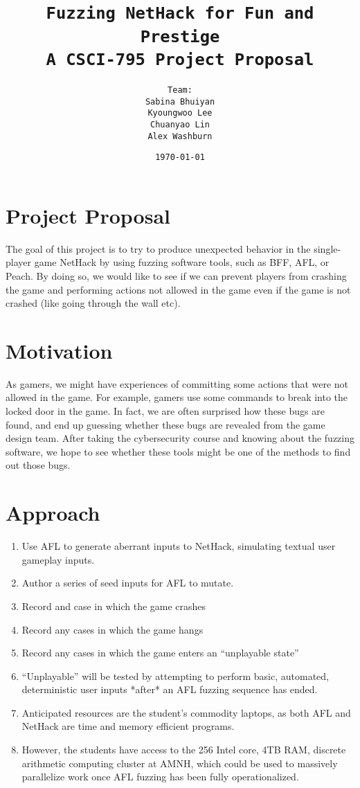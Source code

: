 \documentclass[12pt]{diazessay}
\title{\texttt{\huge{Fuzzing NetHack for Fun and Prestige} \\ {\large A CSCI-795 Project Proposal}}} %
\author{\texttt{{\Huge Team:}\\\vspace*{-0.5em} 
		Sabina Bhuiyan \\\vspace*{-0.5em} 
		Kyoungwoo Lee \\\vspace*{-0.5em}
		Chuanyao Lin \\\vspace*{-0.25em}
		Alex Washburn}} %
\date{\texttt{\today}} %
\begin{document}
\maketitle %

\section*{Project Proposal}

The goal of this project is to try to produce unexpected behavior in the single-player game NetHack by using fuzzing software tools, such as BFF, AFL, or Peach.
By doing so, we would like to see if we can prevent players from crashing the game and performing actions not allowed in the game even if the game is not crashed (like going through the wall etc).


\section*{Motivation}

As gamers, we might have experiences of committing some actions that were not allowed in the game.
For example, gamers use some commands to break into the locked door in the game.
In fact, we are often surprised how these bugs are found, and end up guessing whether these bugs are revealed from the game design team.
After taking the cybersecurity course and knowing about the fuzzing software, we hope to see whether these tools might be one of the methods to find out those bugs.


\section*{Approach}

\begin{enumerate}
  \item Use AFL to generate aberrant inputs to NetHack, simulating textual user gameplay inputs.
  \item Author a series of seed inputs for AFL to mutate.
  \item Record and case in which the game crashes
  \item Record any cases in which the game hangs
  \item Record any cases in which the game enters an “unplayable state”
  \item “Unplayable” will be tested by attempting to perform basic, automated, deterministic user inputs *after* an AFL fuzzing sequence has ended.
  \item Anticipated resources are the student’s commodity laptops, as both AFL and NetHack are time and memory efficient programs.
  \item However, the students have access to the 256 Intel core, 4TB RAM, discrete arithmetic computing cluster at AMNH, which could be used to massively parallelize work once AFL fuzzing has been fully operationalized.
\end{enumerate}
\end{document}
